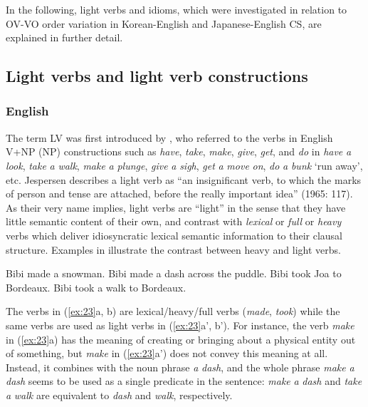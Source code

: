 In the following, light verbs and idioms, which were investigated in relation to \ac{OV}-\ac{VO} order variation in Korean-English and Japanese-English \ac{CS}, are explained in further detail. 
	
\subsection{Light verbs and light verb constructions}\label{ch1:sect:LV}

\subsubsection{English}\label{ch1:sect:English}

The term \ac{LV} was first introduced by \citet{Jespersen1965}, who referred to the verbs in English V+\acs{NP} (\acl{NP})  constructions such as \textit{have}, \textit{take}, \textit{make}, \textit{give}, \textit{get}, and \textit{do} in \textit{have} \textit{a} \textit{look}, \textit{take} \textit{a} \textit{walk}, \textit{make} \textit{a} \textit{plunge}, \textit{give} \textit{a} \textit{sigh}, \textit{get} \textit{a} \textit{move} \textit{on}, \textit{do} \textit{a} \textit{bunk} ‘run away’, etc. Jespersen describes a light verb as “an insignificant verb, to which the marks of person and tense are attached, before the really important idea” (1965: 117). As their very name implies, light verbs are ``light'' in the sense that they have little semantic content of their own, and contrast with \textit{lexical} or \textit{full} or \textit{heavy} verbs which deliver idiosyncratic lexical semantic information to their clausal structure. Examples in  illustrate the contrast between heavy and light verbs.

\begin{exe}\ex\label{ex:23}
\begin{xlist}
    \ex\label{ex:23a} Bibi made a snowman.
     Bibi made a dash across the puddle.
    \ex\label{ex:23b} Bibi took Joa to Bordeaux.
     Bibi took a walk to Bordeaux.
\end{xlist}
\end{exe}

The verbs in (\ref{ex:23}a, b) are lexical/heavy/full verbs (\textit{made}, \textit{took}) while the same verbs are used as light verbs in (\ref{ex:23}a', b'). For instance, the verb \textit{make} in (\ref{ex:23}a) has the meaning of creating or bringing about a physical entity out of something, but \textit{make} in (\ref{ex:23}a') does not convey this meaning at all. Instead, it combines with the noun phrase \textit{a} \textit{dash}, and the whole phrase \textit{make} \textit{a} \textit{dash} seems to be used as a single predicate in the sentence: \textit{make} \textit{a} \textit{dash} and \textit{take} \textit{a} \textit{walk} are equivalent to \textit{dash} and \textit{walk}, respectively. 

